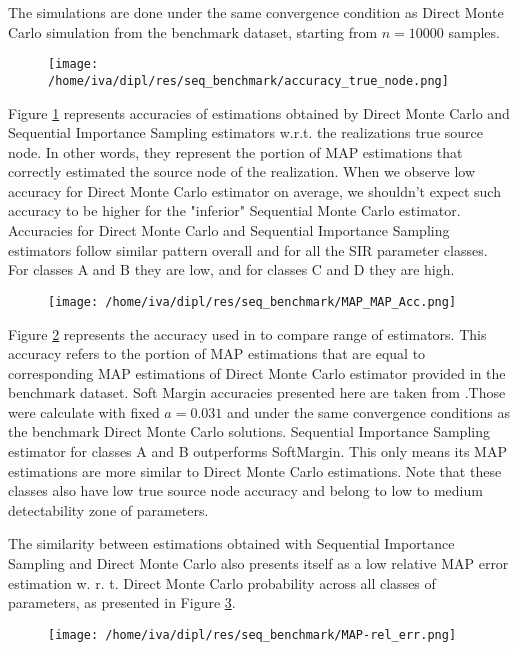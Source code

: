 \documentclass[times, utf8, diplomski]{fer}
\begin{document}
The simulations are done under the same convergence condition as Direct Monte Carlo simulation from the benchmark dataset, starting from $n = 10000$ samples.

\begin{figure}[H]
\texttt{[image: /home/iva/dipl/res/seq\_benchmark/accuracy\_true\_node.png]}
\caption{}
\label{accuracy_true}
\end{figure}
Figure \ref{accuracy_true} represents accuracies of estimations obtained by Direct Monte Carlo and Sequential Importance Sampling estimators w.r.t. the realizations true source node. In other words, they represent the portion of MAP estimations that correctly estimated the source node of the realization. When we observe low accuracy for Direct Monte Carlo estimator on average, we shouldn't expect such accuracy to be higher for the "inferior" Sequential Monte Carlo estimator. Accuracies for Direct Monte Carlo and Sequential Importance Sampling estimators follow similar pattern overall and for all the SIR parameter classes. For classes A and B they are low, and for classes C and D they are high. 

\begin{figure}[H]
\texttt{[image: /home/iva/dipl/res/seq\_benchmark/MAP\_MAP\_Acc.png]}
\caption{}
\label{map_map_acc}
\end{figure}
Figure \ref{map_map_acc} represents the accuracy used in \cite{Nino} to compare range of estimators. This accuracy refers to the portion of MAP estimations that are equal to corresponding MAP estimations of Direct Monte Carlo estimator provided in the benchmark dataset. Soft Margin accuracies presented here are taken from \cite{Nino}.Those were calculate with fixed $a=0.031$ and under the same convergence conditions as the benchmark Direct Monte Carlo solutions. Sequential Importance Sampling estimator for classes A and B outperforms SoftMargin. This only means its MAP estimations are  more similar to Direct Monte Carlo estimations. Note that these classes also have low true source node accuracy and belong to low  to medium detectability zone of parameters.

The similarity between estimations obtained with Sequential Importance Sampling and Direct Monte Carlo also presents itself as a low relative MAP error estimation w. r. t. Direct Monte Carlo probability across all classes of parameters, as presented in Figure \ref{rel_err}.
\begin{figure}
\texttt{[image: /home/iva/dipl/res/seq\_benchmark/MAP-rel\_err.png]}
\caption{}
\label{rel_err}
\end{figure}
\end{document}
